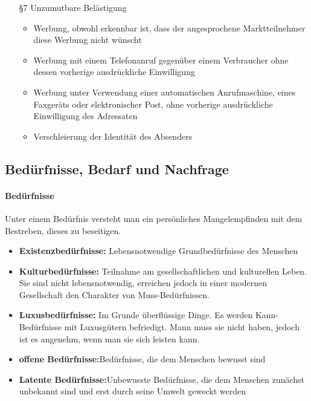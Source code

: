 \begin{itemize}
	\item[§7] Unzumutbare Belästigung
		\begin{itemize}
			\item Werbung, obwohl erkennbar ist, dass der angesprochene Marktteilnehmer diese Werbung nicht wünscht
			\item Werbung mit einem Telefonanruf gegenüber einem Verbraucher ohne dessen vorherige ausdrückliche Einwilligung
			\item Werbung unter Verwendung einer automatischen Anrufmaschine, eines Faxgeräts oder elektronischer Post, ohne vorherige ausdrückliche Einwilligung des Adressaten
			\item Verschleierung der Identität des Absenders
		\end{itemize}
\end{itemize}


\subsection{Bedürfnisse, Bedarf und Nachfrage}
	
	
	\paragraph{Bedürfnisse}
	Unter einem Bedürfnis versteht man ein persönliches Mangelempfinden mit dem Bestreben, dieses zu beseitigen.
		\begin{itemize}
			\item \textbf{Existenzbedürfnisse:} Lebensnotwendige Grundbedürfnisse des Menschen
			\item \textbf{Kulturbedürfnisse:} Teilnahme am gesellschaftlichen und kulturellen Leben. Sie sind nicht lebensnotwendig, erreichen jedoch in einer modernen Gesellschaft den Charakter von Muss-Bedürfnissen.
			\item \textbf{Luxusbedürfnisse:} Im Grunde überflüssige Dinge. Es werden Kann-Bedürfnisse mit Luxusgütern befriedigt. Mann muss sie nicht haben, jedoch ist es angenehm, wenn man sie sich leisten kann.
			\item \textbf{offene Bedürfnisse:}Bedürfnisse, die dem Menschen bewusst sind
			\item \textbf{Latente Bedürfnisse:}Unbewusste Bedürfnisse, die dem Menschen zunächst unbekannt sind und erst durch seine Umwelt geweckt werden
			\par
		\end{itemize}
	
